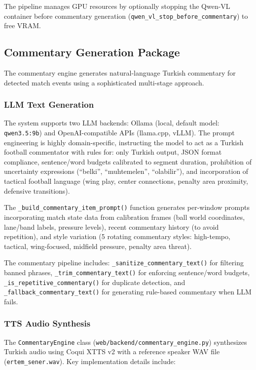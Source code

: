 \documentclass[10pt,twocolumn,a4paper]{article}
\begin{document}
The pipeline manages GPU resources by optionally stopping the Qwen-VL container before commentary generation (\texttt{qwen\_vl\_stop\_before\_commentary}) to free VRAM.

\subsection{Commentary Generation Package}

The commentary engine generates natural-language Turkish commentary for detected match events using a sophisticated multi-stage approach.

\subsubsection{LLM Text Generation}
The system supports two LLM backends: Ollama (local, default model: \texttt{qwen3.5:9b}) and OpenAI-compatible APIs (llama.cpp, vLLM). The prompt engineering is highly domain-specific, instructing the model to act as a Turkish football commentator with rules for: only Turkish output, JSON format compliance, sentence/word budgets calibrated to segment duration, prohibition of uncertainty expressions (``belki'', ``muhtemelen'', ``olabilir''), and incorporation of tactical football language (wing play, center connections, penalty area proximity, defensive transitions).

The \texttt{\_build\_commentary\_item\_prompt()} function generates per-window prompts incorporating match state data from calibration frames (ball world coordinates, lane/band labels, pressure levels), recent commentary history (to avoid repetition), and style variation (5 rotating commentary styles: high-tempo, tactical, wing-focused, midfield pressure, penalty area threat).

The commentary pipeline includes: \texttt{\_sanitize\_commentary\_text()} for filtering banned phrases, \texttt{\_trim\_commentary\_text()} for enforcing sentence/word budgets, \texttt{\_is\_repetitive\_commentary()} for duplicate detection, and \texttt{\_fallback\_commentary\_text()} for generating rule-based commentary when LLM fails.

\subsubsection{TTS Audio Synthesis}
The \texttt{CommentaryEngine} class (\texttt{web/backend/commentary\_engine.py}) synthesizes Turkish audio using Coqui XTTS v2 with a reference speaker WAV file (\texttt{ertem\_sener.wav}). Key implementation details include:
\end{document}
